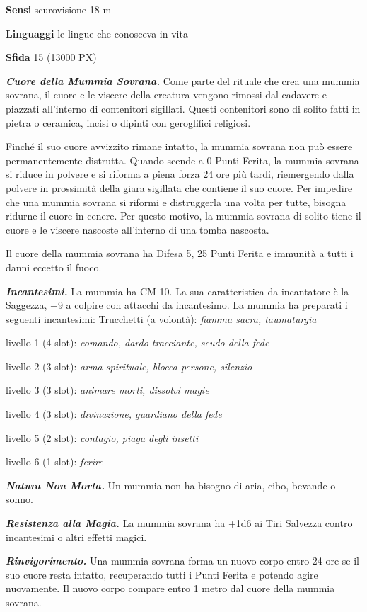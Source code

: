 \begin{multicols}{2}
	\textbf{Sensi} scurovisione 18 m

	\textbf{Linguaggi} le lingue che conosceva in vita

	\textbf{Sfida} 15 (13000 PX)

	\textit{\textbf{Cuore della Mummia Sovrana.}} Come parte del rituale che crea una mummia sovrana, il cuore e le viscere della creatura vengono rimossi dal cadavere e piazzati all'interno di contenitori sigillati. Questi contenitori sono di solito fatti in pietra o ceramica, incisi o dipinti con geroglifici religiosi.

	Finché il suo cuore avvizzito rimane intatto, la mummia sovrana non può essere permanentemente distrutta. Quando scende a 0 Punti Ferita, la mummia sovrana si riduce in polvere e si riforma a piena forza 24 ore più tardi, riemergendo dalla polvere in prossimità della giara sigillata che contiene il suo cuore. Per impedire che una mummia sovrana si riformi e distruggerla una volta per tutte, bisogna ridurne il cuore in cenere. Per questo motivo, la mummia sovrana di solito tiene il cuore e le viscere nascoste all'interno di una tomba nascosta.

	Il cuore della mummia sovrana ha Difesa 5, 25 Punti Ferita e immunità a tutti i danni eccetto il fuoco.

	\textit{\textbf{Incantesimi.}} La mummia ha CM 10. La sua caratteristica da incantatore è la Saggezza, +9 a colpire con attacchi da incantesimo. La mummia ha preparati i seguenti incantesimi: Trucchetti (a volontà): \textit{fiamma sacra, taumaturgia}

	livello 1 (4 slot): \textit{comando, dardo tracciante, scudo della fede}

	livello 2 (3 slot): \textit{arma spirituale, blocca persone, silenzio}

	livello 3 (3 slot): \textit{animare morti, dissolvi magie}

	livello 4 (3 slot): \textit{divinazione, guardiano della fede}

	livello 5 (2 slot): \textit{contagio, piaga degli insetti}

	livello 6 (1 slot): \textit{ferire}

	\textit{\textbf{Natura Non Morta.}} Un mummia non ha bisogno di aria, cibo, bevande o sonno.

	\textit{\textbf{Resistenza alla Magia.}} La mummia sovrana ha +1d6 ai Tiri Salvezza contro incantesimi o altri effetti magici.

	\textit{\textbf{Rinvigorimento.}} Una mummia sovrana forma un nuovo corpo entro 24 ore se il suo cuore resta intatto, recuperando tutti i Punti Ferita e potendo agire nuovamente. Il nuovo corpo compare entro 1 metro dal cuore della mummia sovrana.


\end{multicols}
